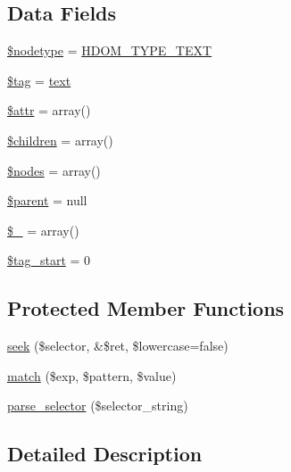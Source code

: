 \subsection*{Data Fields}
\begin{DoxyCompactItemize}
\item 
\hyperlink{classsimple__html__dom__node_abc1baa5da51bb7404ed787754af7e28b}{\$nodetype} = \hyperlink{simple__html__dom_8php_a453ed0a38bfe7684e94b0a2462317581}{H\+D\+O\+M\+\_\+\+T\+Y\+P\+E\+\_\+\+T\+E\+X\+T}
\item 
\hyperlink{classsimple__html__dom__node_a81d5015d41ed8ec66e9db8cdc5db9555}{\$tag} = \textquotesingle{}\hyperlink{classsimple__html__dom__node_a37df362c2f77a0045fa8af094f432238}{text}\textquotesingle{}
\item 
\hyperlink{classsimple__html__dom__node_a0b41385738b43ee6b8668650e7a4c990}{\$attr} = array()
\item 
\hyperlink{classsimple__html__dom__node_aafda1a84fe840800c9884c167093f759}{\$children} = array()
\item 
\hyperlink{classsimple__html__dom__node_afc84f46342a660cca8589570197bc421}{\$nodes} = array()
\item 
\hyperlink{classsimple__html__dom__node_a4e2313a4b35b72a06ac45fd38960f677}{\$parent} = null
\item 
\hyperlink{classsimple__html__dom__node_a4d36a5af9eae86547e70574573b45f33}{\$\+\_\+} = array()
\item 
\hyperlink{classsimple__html__dom__node_af1af90d3ddaae5df362bdbfa7a5eb7e4}{\$tag\+\_\+start} = 0
\end{DoxyCompactItemize}
\subsection*{Protected Member Functions}
\begin{DoxyCompactItemize}
\item 
\hyperlink{classsimple__html__dom__node_a55c896ff710c8cb226a17ff3d6e0c17a}{seek} (\$selector, \&\$ret, \$lowercase=false)
\item 
\hyperlink{classsimple__html__dom__node_a9c8fedd7bb7953c0849835ace1d11852}{match} (\$exp, \$pattern, \$value)
\item 
\hyperlink{classsimple__html__dom__node_a39d57c8087a0b463eeb942a1d8042013}{parse\+\_\+selector} (\$selector\+\_\+string)
\end{DoxyCompactItemize}


\subsection{Detailed Description}


